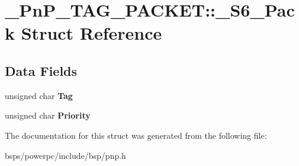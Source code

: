 \hypertarget{struct__PnP__TAG__PACKET_1_1__S6__Pack}{}\section{\+\_\+\+Pn\+P\+\_\+\+T\+A\+G\+\_\+\+P\+A\+C\+K\+ET\+::\+\_\+\+S6\+\_\+\+Pack Struct Reference}
\label{struct__PnP__TAG__PACKET_1_1__S6__Pack}
\subsection*{Data Fields}
\begin{DoxyCompactItemize}
\item 
\mbox{\label{struct__PnP__TAG__PACKET_1_1__S6__Pack_a1d5e2a22a949cdbe5b6c488978c178cb}} 
unsigned char {\bfseries Tag}
\item 
\mbox{\label{struct__PnP__TAG__PACKET_1_1__S6__Pack_a0f461aef1ab1fe8a5816e58559515c3c}} 
unsigned char {\bfseries Priority}
\end{DoxyCompactItemize}


The documentation for this struct was generated from the following file\+:\begin{DoxyCompactItemize}
\item 
bsps/powerpc/include/bsp/pnp.\+h\end{DoxyCompactItemize}
